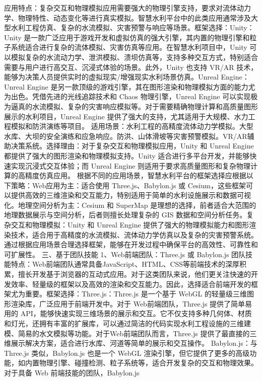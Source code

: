 {应用特点：复杂交互和物理模拟应用需要强大的物理引擎支持，要求对流体动力学、物理特性、动态变化等进行真实模拟。智慧水利平台中的此类应用通常涉及大型水利工程仿真、复杂的水流模拟、灾害预警与响应等场景。框架选择：Unity：Unity
是一款广泛应用于游戏开发和虚拟仿真的强大引擎，其内置的物理引擎和粒子系统适合进行复杂的流体模拟、灾害仿真等应用。在智慧水利项目中，Unity
可以模拟复杂的水流动力学、泄洪模拟、溃坝仿真等，支持多种交互方式，特别适合需要与用户进行高交互、沉浸式体验的场景。此外，Unity 也支持 VR/AR 技术，能够为决策人员提供实时的虚拟现实/增强现实水利场景仿真。Unreal
Engine：Unreal Engine 是另一款顶级的游戏引擎，其在图形渲染和物理模拟方面的能力尤为出色。凭借先进的光线追踪技术和 Chaos 物理引擎，Unreal Engine
可以实现极为逼真的水流模拟、复杂的灾害响应模拟等。对于需要精确物理计算和高质量图形展示的水利项目，Unreal Engine 提供了强大的支持，尤其适用于大规模、水力工程模拟和防洪演练等项目。
适用场景：水利工程的高精度流体动力学模拟。大型水库、大坝的安全演练和应急响应。防洪、山体滑坡等灾害预警模拟。VR/AR辅助决策系统。选择理由：对于复杂交互和物理模拟应用，Unity 和 Unreal Engine
都提供了强大的图形渲染和物理模拟支持。Unity 适合进行多平台开发，并能够快速实现沉浸式交互体验；而 Unreal Engine 则适用于要求高质量图形和复杂物理计算的高精度仿真应用。
根据不同的应用场景，智慧水利平台的框架选择应根据以下策略：Web应用为主：适合使用 Three.js、Babylon.js 或
Cesium，这些框架可以提供高效的三维渲染和交互能力，特别适用于简单的水利设施展示和数据可视化。地理空间分析为主：Cesium 和 SuperMap 是理想的选择，前者适合大范围的地理数据展示与空间分析，后者则擅长处理复杂的 GIS
数据和空间分析任务。复杂交互和物理模拟：Unity 和 Unreal Engine
提供了强大的物理模拟能力和图形渲染技术，适合用于高精度的水流模拟、流体动力学仿真以及复杂的灾害预警系统。通过根据应用场景合理选择框架，能够在开发过程中确保平台的高效性、可靠性和可扩展性。 三、基于团队技能
1、Web前端团队：Three.js 或 Babylon.js
团队技能特点：Web前端团队通常具备JavaScript、HTML、CSS等前端技术的深厚积累，擅长开发基于浏览器的互动式应用。对于这类团队来说，他们更关注快速的开发效率、轻量级的框架以及高效的渲染和交互能力。因此，选择适合前端开发的框架尤为重要。框架选择：Three.js：Three.js
是一个基于 WebGL 的轻量级三维图形渲染库，广泛应用于前端开发中。对于 Web前端团队，Three.js 提供了简单易用的
API，能够快速实现三维场景的展示和交互。它不仅支持多种几何体、材质和灯光，还拥有丰富的扩展库，可以通过简洁的代码实现水利工程设施的三维建模、简易的水文模拟等功能。对于Web前端团队而言，Three.js
提供了最直接的三维展示解决方案，适合进行水库、河道等简单的展示和交互操作。 Babylon.js：与 Three.js 类似，Babylon.js 也是一个 WebGL
渲染引擎，但它提供了更多的高级功能，如内置物理引擎、碰撞检测、粒子系统等，适合开发复杂的交互和物理效果。对于具备 Web 前端技能的团队，Babylon.js
}
